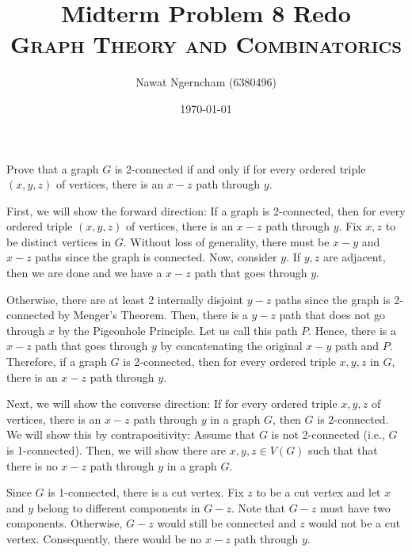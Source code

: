 \documentclass[answers]{exam}
\title{\Huge{Midterm Problem 8 Redo}
	\\
\Large\scshape{Graph Theory and Combinatorics}}
\author{Nawat Ngerncham (6380496)}
\date{\today}
\begin{document}
\maketitle

\begin{questions}
  \setcounter{question}{7}
  \question Prove that a graph \(G\) is 2-connected if and only if
  for every ordered triple \((x, y, z)\) of vertices, there is an
  \(x-z\) path through \(y\).
  \begin{solution}
    First, we will show the forward direction: If a graph is
    2-connected, then for every ordered triple \((x, y, z)\) of
    vertices, there is an \(x-z\) path through \(y\). Fix \(x,
    z\) to be distinct vertices in \(G\). Without loss of
    generality, there must be \(x-y\) and \(x-z\) paths since the
    graph is connected. Now, consider \(y\). If \(y, z\) are
    adjacent, then we are done and we have a \(x-z\) path that
    goes through \(y\).

    Otherwise, there are at least 2 internally disjoint \(y-z\)
    paths since the graph is 2-connected by Menger's Theorem.
    Then, there is a \(y-z\) path that does not go through \(x\)
    by the Pigeonhole Principle. Let us call this path \(P\).
    Hence, there is a \(x-z\) path that goes through \(y\) by
    concatenating the original \(x-y\) path and \(P\). Therefore,
    if a graph \(G\) is 2-connected, then for every ordered
    triple \(x, y, z\) in \(G\), there is an \(x-z\) path through
    \(y\).

    Next, we will show the converse direction: If for every
    ordered triple \(x, y, z\) of vertices, there is an \(x-z\)
    path through \(y\) in a graph \(G\), then \(G\) is
    2-connected. We will show this by contrapositivity:
    Assume that \(G\) is not 2-connected (i.e., \(G\) is 
    1-connected). Then, we will show there are \(x, y, z \in 
    V(G)\) such that that there is no \(x-z\) path
    through \(y\) in a graph \(G\).

    Since \(G\) is 1-connected, there is a cut vertex. Fix \(z\)
    to be a cut vertex and let \(x\) and \(y\) belong to 
    different components in \(G-z\). Note that \(G-z\) must have
    two components. Otherwise, \(G-z\) would still be connected
    and \(z\) would not be a cut vertex. Consequently, there
    would be no \(x-z\) path through \(y\).
  \end{solution}
\end{questions}

% 
% 
\end{document}
